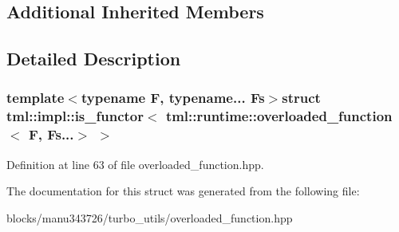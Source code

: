 \subsection*{Additional Inherited Members}


\subsection{Detailed Description}
\subsubsection*{template$<$typename F, typename... Fs$>$struct tml\+::impl\+::is\+\_\+functor$<$ tml\+::runtime\+::overloaded\+\_\+function$<$ F, Fs...$>$ $>$}



Definition at line 63 of file overloaded\+\_\+function.\+hpp.



The documentation for this struct was generated from the following file\+:\begin{DoxyCompactItemize}
\item 
blocks/manu343726/turbo\+\_\+utils/overloaded\+\_\+function.\+hpp\end{DoxyCompactItemize}

